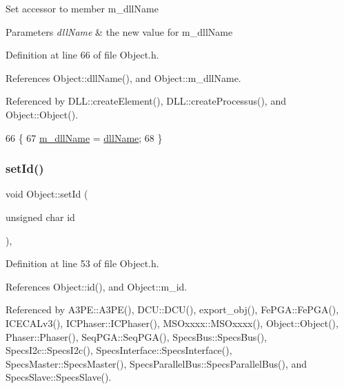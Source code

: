 Set accessor to member m\+\_\+dll\+Name 
\begin{DoxyParams}{Parameters}
{\em dll\+Name} & the new value for m\+\_\+dll\+Name \\
\hline
\end{DoxyParams}


Definition at line 66 of file Object.\+h.



References Object\+::dll\+Name(), and Object\+::m\+\_\+dll\+Name.



Referenced by D\+L\+L\+::create\+Element(), D\+L\+L\+::create\+Processus(), and Object\+::\+Object().


\begin{DoxyCode}
66                                       \{
67     \hyperlink{classObject_a01afbeacebb8db6831559972ec362eb3}{m\_dllName} = \hyperlink{classObject_a2e3947f2870094c332d7454117f3ec63}{dllName};
68   \}
\end{DoxyCode}
\mbox{\label{classObject_a398fe08cba594a0ce6891d59fe4f159f}} 
\subsubsection{\texorpdfstring{set\+Id()}{setId()}}
{\footnotesize\ttfamily void Object\+::set\+Id (\begin{DoxyParamCaption}\item[{unsigned char}]{id }\end{DoxyParamCaption})\hspace{0.3cm}{\ttfamily [inline]}, {\ttfamily [inherited]}}



Definition at line 53 of file Object.\+h.



References Object\+::id(), and Object\+::m\+\_\+id.



Referenced by A3\+P\+E\+::\+A3\+P\+E(), D\+C\+U\+::\+D\+C\+U(), export\+\_\+obj(), Fe\+P\+G\+A\+::\+Fe\+P\+G\+A(), I\+C\+E\+C\+A\+Lv3(), I\+C\+Phaser\+::\+I\+C\+Phaser(), M\+S\+Oxxxx\+::\+M\+S\+Oxxxx(), Object\+::\+Object(), Phaser\+::\+Phaser(), Seq\+P\+G\+A\+::\+Seq\+P\+G\+A(), Specs\+Bus\+::\+Specs\+Bus(), Specs\+I2c\+::\+Specs\+I2c(), Specs\+Interface\+::\+Specs\+Interface(), Specs\+Master\+::\+Specs\+Master(), Specs\+Parallel\+Bus\+::\+Specs\+Parallel\+Bus(), and Specs\+Slave\+::\+Specs\+Slave().


